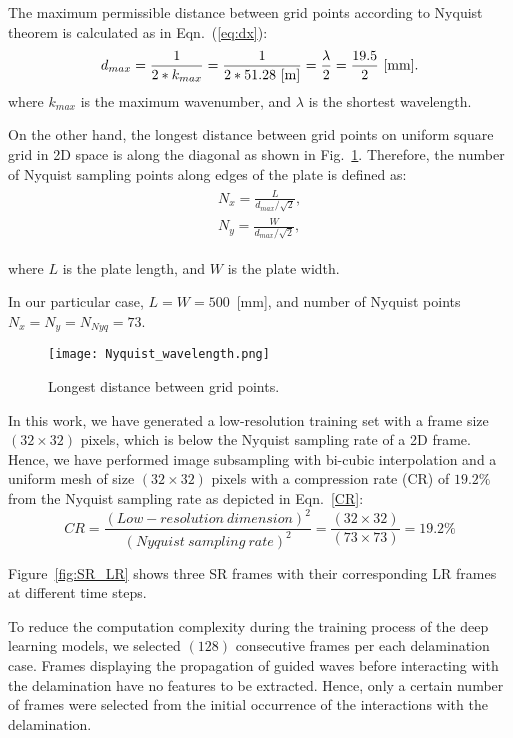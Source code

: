The maximum permissible distance between grid points according to Nyquist theorem is calculated as in Eqn.~(\ref{eq:dx}):
\begin{equation}
	d_{max}= \frac{1}{2*k_{max}} = \frac{1}{2*51.28\ [\textup{m}]} = \frac{\lambda}{2} = \frac{19.5}{2}\ \textup{[mm]}.
	\label{eq:dx}	
\end{equation} 
where $k_{max}$ is the maximum wavenumber, and $\lambda$ is the shortest wavelength.

On the other hand, the longest distance between grid points on uniform square grid in 2D space is along the diagonal as shown in Fig.~\ref{fig:Nyquist}.
Therefore, the number of Nyquist sampling points along edges of the plate is defined as:
\begin{align}
	\begin{split}
		N_x= \frac{L}{d_{max}/\sqrt{2}}, \\
		N_y=  \frac{W}{d_{max}/\sqrt{2}},
	\end{split}
	\label{eq:Nyq}
\end{align}

where $L$ is the plate length, and $W$ is the plate width.

In our particular case, $L=W=500$~[mm], and number of Nyquist points $N_x= N_y= N_{Nyq} =73$.

\begin{figure} [!h]
	\centering
	\texttt{[image: Nyquist\_wavelength.png]}
	\caption{Longest distance between grid points.}
	\label{fig:Nyquist}
\end{figure}


In this work, we have generated a low-resolution training set with a frame size \((32\times32)\) pixels, which is below the Nyquist sampling rate of a 2D frame.
Hence, we have performed image subsampling with bi-cubic interpolation and a uniform mesh of size \((32\times32)\) pixels with a compression rate (CR) of \(19.2\%\) from the Nyquist sampling rate as depicted in Eqn.~\ref{CR}:
\begin{equation}
	CR = \frac{(Low-resolution\ dimension)^2}{(Nyquist\ sampling\ rate)^2} = \frac{(32\times32)}{(73\times73)}=19.2\%
	\label{CR}
\end{equation}

Figure~\ref{fig:SR_LR} shows three SR frames with their corresponding LR frames at different time steps.

To reduce the computation complexity during the training process of the deep learning models, we selected \((128)\) consecutive frames per each delamination case.
Frames displaying the propagation of guided waves before interacting with the delamination have no features to be extracted. 
Hence, only a certain number of frames were selected from the initial occurrence of the interactions with the delamination.

